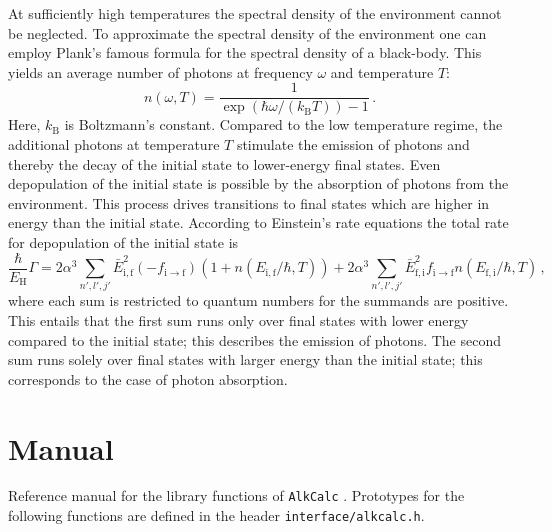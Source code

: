\documentclass[fontsize=12pt,
               twoside=false,
               BCOR=0mm,
               DIV=14,
               overfullrule=false, %
               toc=bibliography,
               headinclude=true,
               footinclude=false]{scrartcl}
\numberwithin{equation}{section}
\newcommand{\EH}{E_\mathrm{H}}
\newcommand{\kBT}{k_\mathrm{B}T}
\newcommand{\alkcalc}{\texttt{AlkCalc} }
\begin{document}
    At sufficiently high temperatures the spectral density of the environment
    cannot be neglected. To approximate the spectral density of the environment
    one can employ Plank's famous formula \cite{plank1901} for the spectral
    density of a black-body. This yields an average number of photons at
    frequency $\omega$ and temperature $T$:
    \begin{equation}
        n(\omega,T)
        =
        \frac{1}{\exp(\hbar\omega\slash(\kBT))-1}
    \,.
    \end{equation}
    Here, $k_\mathrm{B}$ is Boltzmann's constant. Compared to the low
    temperature regime, the additional photons at temperature $T$ stimulate the
    emission of photons and thereby the decay of the initial state to
    lower-energy final states. Even depopulation of the initial state is
    possible by the absorption of photons from the environment. This process
    drives transitions to final states which are higher in energy than the
    initial state. According to Einstein's rate equations \cite{einstein1917}
    the total rate for depopulation of the initial state is
    \begin{equation}\label{eq:LifetimeFormula}
        \frac{\hbar}{\EH}\Gamma
        =
        2\alpha^3
        \sum_{n',l',j'}
        \bar{E}^2_\mathrm{i,f} (-f_{\mathrm{i}\to\mathrm{f}})
        (1+n(E_\mathrm{i,f}\slash\hbar,T))
        +
        2\alpha^3
        \sum_{n',l',j'}
        \bar{E}^2_\mathrm{f,i} f_{\mathrm{i}\to\mathrm{f}}
        n(E_\mathrm{f,i}\slash\hbar,T)
    \,,
    \end{equation}
    where each sum is restricted to quantum numbers for the summands are
    positive. This entails that the first sum runs only over final states with
    lower energy compared to the initial state; this describes the emission of
    photons. The second sum runs solely over final states with larger energy
    than the initial state; this corresponds to the case of photon absorption.

    \clearpage

    \section{Manual}
    \label{sec:Manual}

    Reference manual for the library functions of \alkcalc. Prototypes for the
    following functions are defined in the header \texttt{interface/alkcalc.h}.
\end{document}
